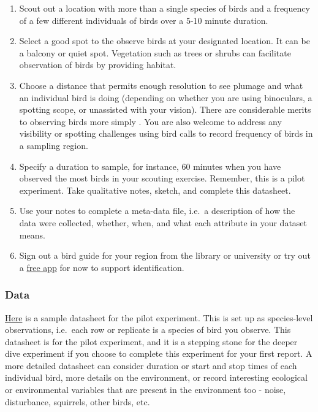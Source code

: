 \documentclass[
]{book}
\providecommand{\tightlist}{%
  \setlength{\itemsep}{0pt}\setlength{\parskip}{0pt}}
\begin{document}
\begin{enumerate}
\def\labelenumi{\arabic{enumi}.}
\tightlist
\item
  Scout out a location with more than a single species of birds and a frequency of a few different individuals of birds over a 5-10 minute duration.\\
\item
  Select a good spot to the observe birds at your designated location. It can be a balcony or quiet spot. Vegetation such as trees or shrubs can facilitate observation of birds by providing habitat.\\
\item
  Choose a distance that permits enough resolution to see plumage and what an individual bird is doing (depending on whether you are using binoculars, a spotting scope, or unassisted with your vision). There are considerable merits to observing birds more simply \citep{RN6773}. You are also welcome to address any visibility or spotting challenges using bird calls to record frequency of birds in a sampling region.\\
\item
  Specify a duration to sample, for instance, 60 minutes when you have observed the most birds in your scouting exercise. Remember, this is a pilot experiment. Take qualitative notes, sketch, and complete this datasheet.\\
\item
  Use your notes to complete a meta-data file, i.e.~a description of how the data were collected, whether, when, and what each attribute in your dataset means.\\
\item
  Sign out a bird guide for your region from the library or university or try out a \href{https://www.birds.cornell.edu/k12/best-apps-for-birding-with-kids/}{free app} for now to support identification.
\end{enumerate}

\hypertarget{data}{%
\subsubsection*{Data}\label{data}}

\href{https://figshare.com/articles/dataset/BIOL3250_birds_datasheet/12756101}{Here} is a sample datasheet for the pilot experiment. This is set up as species-level observations, i.e.~each row or replicate is a species of bird you observe. This datasheet is for the pilot experiment, and it is a stepping stone for the deeper dive experiment if you choose to complete this experiment for your first report. A more detailed datasheet can consider duration or start and stop times of each individual bird, more details on the environment, or record interesting ecological or environmental variables that are present in the environment too - noise, disturbance, squirrels, other birds, etc.
\end{document}
